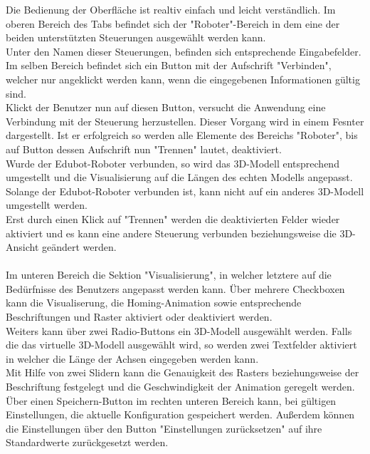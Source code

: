 Die Bedienung der Oberfläche ist realtiv einfach und leicht verständlich. Im oberen Bereich des Tabs befindet sich der "Roboter"-Bereich in dem eine der beiden unterstützten Steuerungen ausgewählt werden kann.\\ 
Unter den Namen dieser Steuerungen, befinden sich entsprechende Eingabefelder. Im selben Bereich befindet sich ein Button mit der Aufschrift "Verbinden", welcher nur angeklickt werden kann, wenn die eingegebenen Informationen gültig sind.\\
Klickt der Benutzer nun auf diesen Button, versucht die Anwendung eine Verbindung mit der Steuerung herzustellen. Dieser Vorgang wird in einem Fesnter dargestellt. Ist er erfolgreich so werden alle Elemente des Bereichs "Roboter", bis auf Button dessen Aufschrift nun "Trennen" lautet, deaktiviert. \\
Wurde der Edubot-Roboter verbunden, so wird das 3D-Modell entsprechend umgestellt und die Visualisierung auf die Längen des echten Modells angepasst. Solange der Edubot-Roboter verbunden ist, kann nicht auf ein anderes 3D-Modell umgestellt werden.\\
Erst durch einen Klick auf "Trennen" werden die deaktivierten Felder wieder aktiviert und es kann eine andere Steuerung verbunden beziehungsweise die 3D-Ansicht geändert werden.\\
\\
Im unteren Bereich die Sektion "Visualisierung", in welcher letztere auf die Bedürfnisse des Benutzers angepasst werden kann. Über mehrere Checkboxen kann die Visualiserung, die Homing-Animation sowie entsprechende Beschriftungen und Raster aktiviert oder deaktiviert werden. \\
Weiters kann über zwei Radio-Buttons ein 3D-Modell ausgewählt werden. Falls die das virtuelle 3D-Modell ausgewählt wird, so werden zwei Textfelder aktiviert in welcher die Länge der Achsen eingegeben werden kann.\\
Mit Hilfe von zwei Slidern kann die Genauigkeit des Rasters beziehungsweise der Beschriftung festgelegt und die Geschwindigkeit der Animation geregelt werden.\\
Über einen Speichern-Button im rechten unteren Bereich kann, bei gültigen Einstellungen, die aktuelle Konfiguration gespeichert werden. Außerdem können die Einstellungen über den Button "Einstellungen zurücksetzen" auf ihre Standardwerte zurückgesetzt werden.

